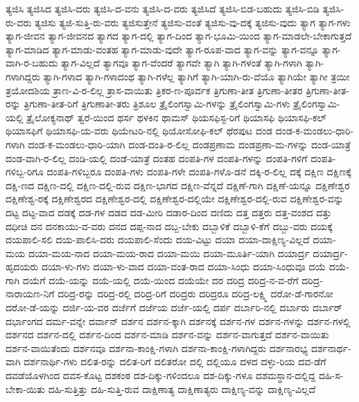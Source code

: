 {ತ್ಯಜಿಸಿ
ತ್ಯಜಿಸಿದ
ತ್ಯಜಿಸಿ-ದರು
ತ್ಯಜಿಸಿ-ದ-ವನು
ತ್ಯಜಿಸಿ-ದ-ವರು
ತ್ಯಜಿಸಿದೆ
ತ್ಯಜಿಸಿ-ಬಿಡ-ಬಹುದು
ತ್ಯಜಿಸಿ-ಬಿಡಿ
ತ್ಯಜಿಸಿ-ರು-ವರು
ತ್ಯಜಿಸು
ತ್ಯಜಿ-ಸುತ್ತಿ-ರು-ವರು
ತ್ಯಜಿಸುತ್ತೇನೆ
ತ್ಯಜಿಸು-ವಂತೆ
ತ್ಯಜಿಸು-ವು-ದಕ್ಕೆ
ತ್ಯಜಿಸು-ವುದು
ತ್ಯಾಗ
ತ್ಯಾಗ-ಗಳು
ತ್ಯಾಗ-ಜೀವನ
ತ್ಯಾಗ-ಜೀವನದ
ತ್ಯಾಗದ
ತ್ಯಾಗ-ದಲ್ಲಿ
ತ್ಯಾಗ-ದಿಂದ
ತ್ಯಾಗ-ಭೂಮಿ-ಯಿಂದ
ತ್ಯಾಗ-ಮಾಡಲೇ-ಬೇಕಾಗುತ್ತದೆ
ತ್ಯಾಗ-ಮಾಡಿದ
ತ್ಯಾಗ-ಮಾಡು-ವಂತಹ
ತ್ಯಾಗ-ಮಾಡು-ವುದೇ
ತ್ಯಾಗ-ರೂಪ-ವಾದ
ತ್ಯಾಗ-ವನ್ನು
ತ್ಯಾಗ-ವನ್ನೂ
ತ್ಯಾಗ-ವಾಗಿ-ರ-ಬಹುದು
ತ್ಯಾಗ-ವಿಲ್ಲದೆ
ತ್ಯಾಗವೂ
ತ್ಯಾಗ-ವೆಂದರೆ
ತ್ಯಾಗವೇ
ತ್ಯಾಗಿ
ತ್ಯಾಗಿ-ಗಳಂತೆ
ತ್ಯಾಗಿ-ಗಳಾಗಿ
ತ್ಯಾಗಿ-ಗಳಾಗಿದ್ದರು
ತ್ಯಾಗಿ-ಗಳಾದ
ತ್ಯಾಗಿ-ಗಳಾದಂಥ
ತ್ಯಾಗಿ-ಗಳೆಲ್ಲ
ತ್ಯಾಗಿಗೆ
ತ್ಯಾಗಿ-ಯಾಗಿ-ರು-ವೆಯೊ
ತ್ಯಾಗಿಯೇ
ತ್ಯಾಗೀ
ತ್ರಯೀ
ತ್ರಯೋದಶಿಯ
ತ್ರಾಣ-ವಿ-ರ-ಲಿಲ್ಲ
ತ್ರಾಸ-ವಾಯಿತು
ತ್ರಿಕರ-ಣ-ಪೂರ್ವಕ
ತ್ರಿಗುಣಾ-ತೀತ
ತ್ರಿಗುಣಾ-ತೀತರ
ತ್ರಿಗುಣಾ-ತೀತ-ರನ್ನು
ತ್ರಿಗುಣಾ-ತೀತ-ರಿಗೆ
ತ್ರಿಗುಣಾತೀ-ತರು
ತ್ರಿಶೂಲ
ತ್ರೈಲಿಂಗಸ್ವಾಮಿ-ಗಳನ್ನು
ತ್ರೈಲಿಂಗಸ್ವಾಮಿ-ಗಳು
ತ್ರೈಲಿಂಗಸ್ವಾಮಿ-ಯಲ್ಲಿ
ತ್ರೈಲೋಕ್ಯನಾಥ್
ತ್ವರೆ-ಯಿಂದ
ಥರ್ಸ
ಥಳಕಿನ
ಥಾಮಸ್
ಥಿಯಸಫಿಸ್ಟ-ರಿಗೆ
ಥಿಯಾಸಫಿ
ಥಿಯಾಸಫಿ-ಕಲ್
ಥಿಯಾಸಫಿಗೆ
ಥಿಯಾಸಫಿ-ಯ-ವರು
ಥಿಯೇಟರಿ-ನಲ್ಲಿ
ಥಿಯೋಸೋಫಿ-ಕಲ್
ಥೆರಪುಟ
ದಂಡ
ದಂಡ-ಕ-ಮಂಡಲು-ಧಾರಿ-ಗಳಾಗಿ
ದಂಡ-ಕ-ಮಂಡಲು-ಧಾರಿ-ಯಾಗಿ
ದಂಡ-ದಂತಿ-ರ-ಲಿಲ್ಲ
ದಂಡಪ್ರಣಾಮ
ದಂಡಪ್ರಣಾ-ಮ-ಗಳನ್ನು
ದಂಡ-ಯಾತ್ರೆ
ದಂಡ-ವಾಗಿ-ರ-ಲಿಲ್ಲ
ದಂಡಿ-ಯಲ್ಲಿ
ದಂಡೆ-ಯಾತ್ರೆ
ದಂತಹ
ದಂಪತಿ-ಗಳ
ದಂಪತಿ-ಗಳನ್ನು
ದಂಪತಿ-ಗಳಿಗೆ
ದಂಪತಿ-ಗಳಿಬ್ಬ-ರಿಗೂ
ದಂಪತಿ-ಗಳಿಬ್ಬರೂ
ದಂಪತಿ-ಗಳು
ದಂಪತಿ-ಗಳೇ
ದಂಪತಿ-ಗಳೊ-ಡನೆ
ದಕ್ಕಿ-ರ-ಲಿಲ್ಲ
ದಕ್ಕೆ
ದಕ್ಷಿಣ
ದಕ್ಷಿಣಕ್ಕೆ
ದಕ್ಷಿ-ಣದ
ದಕ್ಷಿಣ-ದಲ್ಲಿ
ದಕ್ಷಿಣ-ದಲ್ಲಿ-ರುವ
ದಕ್ಷಿಣ-ಭಾಗದ
ದಕ್ಷಿಣ-ವೆನ್ನದೆ
ದಕ್ಷಿಣೆ-ಗಾಗಿ
ದಕ್ಷಿಣೆ-ಯನ್ನೂ
ದಕ್ಷಿಣೇಶ್ವರ
ದಕ್ಷಿಣೇಶ್ವ-ರಕ್ಕೆ
ದಕ್ಷಿಣೇಶ್ವರದ
ದಕ್ಷಿಣೇಶ್ವರ-ದಲ್ಲಿ
ದಕ್ಷಿಣೇಶ್ವರ-ದಲ್ಲಿಯೇ
ದಕ್ಷಿಣೇಶ್ವರ-ದಲ್ಲಿ-ರುವ
ದಕ್ಷಿಣೇಶ್ವರ-ವನ್ನು
ದಟ್ಟ
ದಟ್ಟ-ವಾದ
ದಡಕ್ಕೆ
ದಡ-ಗಳ
ದಡದ
ದಡ-ಮೀರಿ
ದಡಾರ-ದಿಂದ
ದಣಿದು
ದತ್ತ
ದತ್ತರು
ದತ್ತ-ವಂಶದ
ದತ್ತು
ದಧೀಚಿ
ದನ
ದನಕಾಯು-ವ-ವರು
ದನದ
ದಪ್ಪ-ನಾದ
ದಬ್ಬ-ಬೇಕು
ದಬ್ಬಾಳಿಕೆ
ದಬ್ಬಾಳಿ-ಕೆಗೆ
ದಬ್ಬು-ವರು
ದಯಕ್ಕೆ
ದಯಪಾಲಿ-ಸಲಿ
ದಯ-ಪಾಲಿಸಿ-ದರು
ದಯಪಾಲಿ-ಸೆಂದು
ದಯ-ವಿಟ್ಟು
ದಯಾ
ದಯಾ-ದಾಕ್ಷಿಣ್ಯ-ವಿಲ್ಲದೆ
ದಯಾ-ಮಯ
ದಯಾ-ಮಯ-ನಾದ
ದಯಾ-ಮಯ-ರಾದ
ದಯಾ-ಮಯಿ
ದಯಾ-ಮೂರ್ತಿ-ಯಾಗಿ
ದಯಾರ್ದ್ರ
ದಯಾರ್ದ್ರ-ಹೃದಯರು
ದಯಾ-ಳು-ಗಳು
ದಯಾ-ಳು-ವಾದ
ದಯಾ-ವಂತ-ರಾದ
ದಯಾ-ಸಿಂಧು
ದಯಾ-ಸಿಂಧುವೂ
ದಯೆ
ದಯೆ-ಗಾಗಿ
ದಯೆಗೆ
ದಯೆ-ಯನ್ನು
ದಯೆ-ಯಲ್ಲಿ
ದಯೆ-ಯಿಂದ
ದಯೆಯೇ
ದರ
ದರಿದ್ರ
ದರಿದ್ರ-ನ-ವ-ರೆಗೆ
ದರಿದ್ರ-ನಾರಾಯಣ-ನಿಗೆ
ದರಿದ್ರ-ರನ್ನು
ದರಿದ್ರ-ರಲ್ಲಿ
ದರಿದ್ರ-ರಿಗೆ
ದರಿದ್ರರು
ದರಿದ್ರರೂ
ದರಿದ್ರ-ಲಕ್ಷ್ಮಿ
ದರೋ-ಡೆ-ಗಾರನೋ
ದರೋ-ಡೆ-ಯನ್ನು
ದರ್ಜಿ-ಯ-ವರ
ದರ್ಜೆಗೆ
ದರ್ಜೆಯ
ದರ್ಜೆ-ಯಲ್ಲಿ
ದರ್ಪ
ದರ್ಬಾರಿ-ನಲ್ಲಿ
ದರ್ಬಾರು
ದರ್ಬಾರ್
ದರ್ಭಾಂಗದ
ದರ್ಮ-ವನ್ನೇ
ದರ್ವಾನ್
ದರ್ಶನ
ದರ್ಶನ-ಕ್ಕಾಗಿ
ದರ್ಶನಕ್ಕೆ
ದರ್ಶನ-ಗಳ
ದರ್ಶನ-ಗಳನ್ನು
ದರ್ಶನ-ಗಳಲ್ಲಿ
ದರ್ಶನದ
ದರ್ಶನ-ದಲ್ಲಿ
ದರ್ಶನ-ದಿಂದ
ದರ್ಶನ-ಮಾಡಿ
ದರ್ಶನ-ವನ್ನು
ದರ್ಶನ-ವಾಗುತ್ತದೆ
ದರ್ಶನ-ವಾಯಿತು
ದರ್ಶನ-ವಾಯಿತೆಂದು
ದರ್ಶನವೂ
ದರ್ಶನಾ-ಕಾಂಕ್ಷಿ-ಗಳಾಗಿ
ದರ್ಶನಾ-ಕಾಂಕ್ಷಿ-ಗಳಾಗಿದ್ದರು
ದರ್ಶನಾರಭ್ಯ
ದರ್ಶನಾರ್ಥ-ವಾಗಿ
ದರ್ಶನಾರ್ಥಿ-ಗಳು
ದಲಿತ-ರನ್ನು
ದಲಿತ-ರಿಗೆ
ದಲಿತರೋ
ದಲ್ಲಿ
ದಲ್ಲಿಯೂ
ದಳದ
ದಳ್ಳು-ರಿಯ
ದವ-ಡೆಗೆ
ದವಡೆಯೊಳಗಿಂದ
ದವಸ-ಕೊಟ್ಟ
ದಶಕಂಠ
ದಶ-ದಿಕ್ಕು-ಗಳಿಂದಲೂ
ದಶ-ದಿಕ್ಕು-ಗಳೂ
ದಶಮಸ್ಥಾನ-ದಲ್ಲಿದ್ದ
ದಹಿ-ಸ-ಬೇಕಾ-ಯಿತು
ದಹಿ-ಸುತ್ತಿತ್ತು
ದಹಿ-ಸುತ್ತಿ-ರುವ
ದಾಕ್ಷಿಣಾತ್ಯ
ದಾಕ್ಷಿಣಾತ್ಯರು
ದಾಕ್ಷಿಣ್ಯ-ವನ್ನು
ದಾಕ್ಷಿಣ್ಯ-ವಿಲ್ಲದೆ
}
